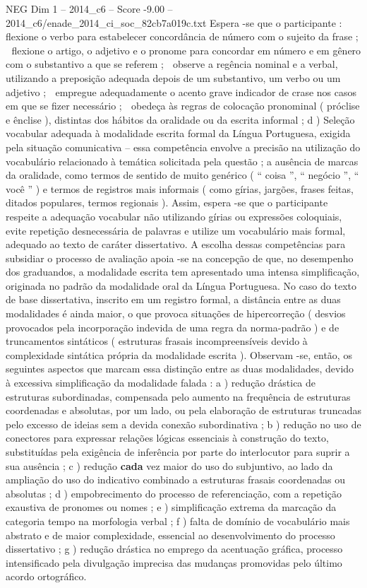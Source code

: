 \begin{textsample}{NEG Dim 1 – 2014\_c6 – Score -9.00 – 2014\_c6/enade\_2014\_ci\_soc\_82cb7a019c.txt}
Espera -se que o participante :  flexione o verbo para estabelecer concordância de número com o sujeito da frase ;  flexione o artigo, o adjetivo e o pronome para concordar em número e em gênero com o substantivo a que se referem ;  observe a regência nominal e a verbal, utilizando a preposição adequada depois de um substantivo, um verbo ou um adjetivo ;  empregue adequadamente o acento grave indicador de crase nos casos em que se fizer necessário ;  obedeça às regras de colocação pronominal ( próclise e ênclise ), distintas dos hábitos da oralidade ou da escrita informal ; d ) Seleção vocabular adequada à modalidade escrita formal da Língua Portuguesa, exigida pela situação comunicativa – essa competência envolve a precisão na utilização do vocabulário relacionado à temática solicitada pela questão ; a ausência de marcas da oralidade, como termos de sentido de muito genérico ( “ coisa ”, “ negócio ”, “ você ” ) e termos de registros mais informais ( como gírias, jargões, frases feitas, ditados populares, termos regionais ).
Assim, espera -se que o participante respeite a adequação vocabular não utilizando gírias ou expressões coloquiais, evite repetição desnecessária de palavras e utilize um vocabulário mais formal, adequado ao texto de caráter dissertativo.
A escolha dessas competências para subsidiar o processo de avaliação apoia -se na concepção de que, no desempenho dos graduandos, a modalidade escrita tem apresentado uma intensa simplificação, originada no padrão da modalidade oral da Língua Portuguesa.
No caso do texto de base dissertativa, inscrito em um registro formal, a distância entre as duas modalidades é ainda maior, o que provoca situações de hipercorreção ( desvios provocados pela incorporação indevida de uma regra da norma-padrão ) e de truncamentos sintáticos ( estruturas frasais incompreensíveis devido à complexidade sintática própria da modalidade escrita ).
Observam -se, então, os seguintes aspectos que marcam essa distinção entre as duas modalidades, devido à excessiva simplificação da modalidade falada : a ) redução drástica de estruturas subordinadas, compensada pelo aumento na frequência de estruturas coordenadas e absolutas, por um lado, ou pela elaboração de estruturas truncadas pelo excesso de ideias sem a devida conexão subordinativa ; b ) redução no uso de conectores para expressar relações lógicas essenciais à construção do texto, substituídas pela exigência de inferência por parte do interlocutor para suprir a sua ausência ; c ) redução \textbf{cada} vez maior do uso do subjuntivo, ao lado da ampliação do uso do indicativo combinado a estruturas frasais coordenadas ou absolutas ; d ) empobrecimento do processo de referenciação, com a repetição exaustiva de pronomes ou nomes ; e ) simplificação extrema da marcação da categoria tempo na morfologia verbal ; f ) falta de domínio de vocabulário mais abstrato e de maior complexidade, essencial ao desenvolvimento do processo dissertativo ; g ) redução drástica no emprego da acentuação gráfica, processo intensificado pela divulgação imprecisa das mudanças promovidas pelo último acordo ortográfico.

\end{textsample}
